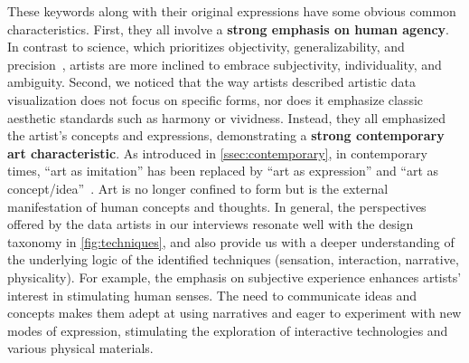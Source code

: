 These keywords along with their original expressions have some obvious common characteristics.
First, they all involve a \textbf{strong emphasis on human agency}. 
In contrast to science, which prioritizes objectivity, generalizability, and precision~\cite{brown2001art}, artists are more inclined to embrace subjectivity, individuality, and ambiguity.
Second, we noticed that the way artists described artistic data visualization does not focus on specific forms, nor does it emphasize classic aesthetic standards such as harmony or vividness. Instead, they all emphasized the artist's concepts and expressions, demonstrating a \textbf{strong contemporary art characteristic}. 
As introduced in \autoref{ssec:contemporary}, in contemporary times, ``art as imitation'' has been replaced by ``art as expression'' and ``art as concept/idea''~\cite{pooke2021art}. Art is no longer confined to form but is the external manifestation of human concepts and thoughts. 
In general, the perspectives offered by the data artists in our interviews resonate well with the design taxonomy in \autoref{fig:techniques}, and also provide us with a deeper understanding of the underlying logic of the identified techniques (\ie sensation, interaction, narrative, physicality). For example, the emphasis on subjective experience enhances artists' interest in stimulating human senses. The need to communicate ideas and concepts makes them adept at using narratives and eager to experiment with new modes of expression, stimulating the exploration of interactive technologies and various physical materials.




